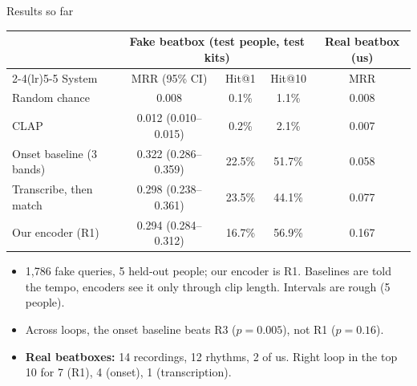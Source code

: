 \begin{frame}{Results so far}

  \centering
  \begin{tabular}{lcccc}
    \toprule
    & \multicolumn{3}{c}{Fake beatbox (test people, test kits)} & Real beatbox (us) \\
    \cmidrule(lr){2-4}\cmidrule(lr){5-5}
    System & MRR (95\% CI) & Hit@1 & Hit@10 & MRR \\
    \midrule
    Random chance & 0.008 & 0.1\% & 1.1\% & 0.008 \\
    CLAP & 0.012 (0.010--0.015) & 0.2\% & 2.1\% & 0.007 \\
    Onset baseline (3 bands) & 0.322 (0.286--0.359) & 22.5\% & 51.7\% & 0.058 \\
    Transcribe, then match & 0.298 (0.238--0.361) & 23.5\% & 44.1\% & 0.077 \\
    Our encoder (R1) & 0.294 (0.284--0.312) & 16.7\% & 56.9\% & 0.167 \\
    \bottomrule
  \end{tabular}

  \vspace{0.1cm}
  \raggedright\footnotesize
  \begin{itemize}
    \item 1,786 fake queries, 5 held-out people; our encoder is R1. Baselines are told the
          tempo, encoders see it only through clip length. Intervals are rough (5 people).
    \item Across loops, the onset baseline beats R3 ($p=0.005$), not R1 ($p=0.16$).
    \item \textbf{Real beatboxes:} 14 recordings, 12 rhythms, 2 of us. Right loop in the top 10
          for 7 (R1), 4 (onset), 1 (transcription).
  \end{itemize}


\end{frame}
